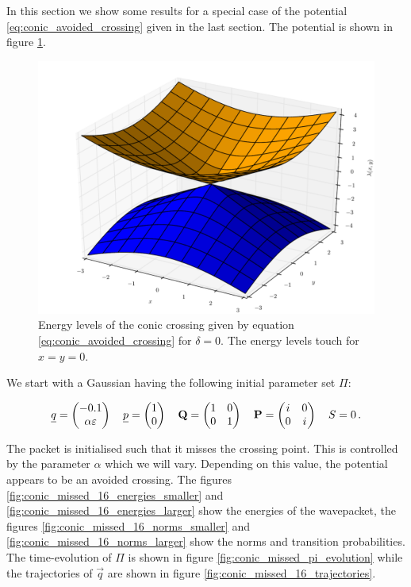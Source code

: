 In this section we show some results for a special case of the potential
\eqref{eq:conic_avoided_crossing} given in the last section. The potential
is shown in figure \ref{fig:conic_intersection}.

\begin{figure}[ht!]
  \centering
  \includegraphics[width=0.7\linewidth]{./fig/conic_intersection.pdf}
  \caption{Energy levels of the conic crossing given by equation \eqref{eq:conic_avoided_crossing}
          for $\delta = 0$. The energy levels touch for $x=y=0$.}
  \label{fig:conic_intersection}
\end{figure}

We start with a Gaussian having the following initial parameter set $\Pi$:

\begin{align*}
  \underline{q} = \begin{pmatrix}
              -0.1 \\ \alpha \varepsilon
            \end{pmatrix}
  \quad
  \underline{p} = \begin{pmatrix}
              1 \\ 0
            \end{pmatrix}
  \quad
  \mathbf{Q} = \begin{pmatrix}
              1 & 0 \\ 0 & 1
            \end{pmatrix}
  \quad
  \mathbf{P} = \begin{pmatrix}
              i & 0 \\ 0 & i
            \end{pmatrix}
  \quad
  S = 0 \,.
\end{align*}

The packet is initialised such that it misses the crossing point. This is controlled by the parameter $\alpha$ which
we will vary. Depending on this value, the potential appears to be an avoided crossing. The figures
\ref{fig:conic_missed_16_energies_smaller} and \ref{fig:conic_missed_16_energies_larger} show the energies of the
wavepacket, the figures \ref{fig:conic_missed_16_norms_smaller} and \ref{fig:conic_missed_16_norms_larger}
show the norms and transition probabilities. The time-evolution of $\Pi$ is shown in figure \ref{fig:conic_missed_pi_evolution}
while the trajectories of $\vec{q}$ are shown in figure \ref{fig:conic_missed_16_trajectories}.

